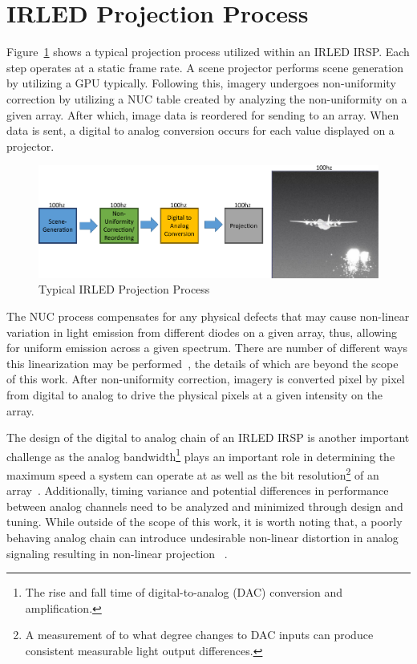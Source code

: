 \section{IRLED Projection Process}
    Figure~\ref{fig:typical_projection} shows a typical projection process utilized within an IRLED IRSP. Each step operates at a static frame rate. A scene projector performs scene generation by utilizing a GPU typically. Following this, imagery undergoes non-uniformity correction by utilizing a NUC table created by analyzing the non-uniformity on a given array. After which, image data is reordered for sending to an array. When data is sent, a digital to analog conversion occurs for each value displayed on a projector.

    \begin{figure}
        \centering
        \includegraphics[width=1.0\textwidth]{fig/typical_projection_system.pdf}
        \caption{Typical IRLED Projection Process}
        \label{fig:typical_projection}
    \end{figure}

    The NUC process compensates for any physical defects that may cause non-linear variation in light emission from different diodes on a given array, thus, allowing for uniform emission across a given spectrum. There are number of different ways this linearization may be performed~\cite{BrowningEtAl2016, LandwehrEtAl2017, BarakhshanEtAl2018_2, BarakhshanEtAl2019, BarakhshanEtAl2019_2}, the details of which are beyond the scope of this work. After non-uniformity correction, imagery is converted pixel by pixel from digital to analog to drive the physical pixels at a given intensity on the array.

    The design of the digital to analog chain of an IRLED IRSP is another important challenge as the analog bandwidth\footnote{The rise and fall time of digital-to-analog (DAC) conversion and amplification.} plays an important role in determining the maximum speed a system can operate at as well as the bit resolution\footnote{A measurement of to what degree changes to DAC inputs can produce consistent measurable light output differences.} of an array~\cite{EjzakEtAl2019}. Additionally, timing variance and potential differences in performance between analog channels need to be analyzed and minimized through design and tuning. While outside of the scope of this work, it is worth noting that, a poorly behaving analog chain can introduce undesirable non-linear distortion in analog signaling resulting in non-linear projection ~\cite{Freeman1977, Gordon1978, ChanEtAl2008}.

